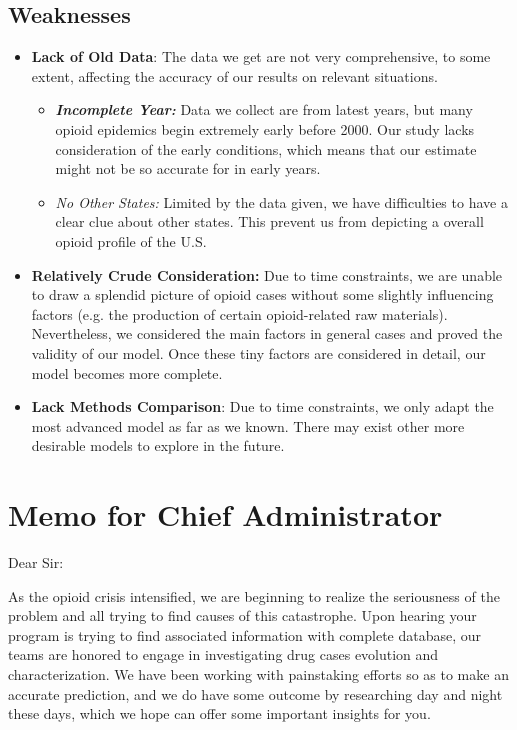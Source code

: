 \documentclass[a4paper]{article}
\begin{document}
\subsection{Weaknesses}

\begin{itemize}
  \item \textbf{Lack of Old Data}: The data we get are not very comprehensive, to some extent, affecting the accuracy of our results on relevant situations.
  \begin{itemize}
      \item \textit{\textbf{Incomplete Year:}} Data we collect are from latest years, but many opioid epidemics begin extremely early before 2000. Our study lacks consideration of the early conditions, which means that our estimate might not be so accurate for in early years.
      \item \textit{No Other States:} Limited by the data given, we have difficulties to have a clear clue about other states. This prevent us from depicting a overall opioid profile of the U.S.
  \end{itemize}
  \item \textbf{Relatively Crude Consideration:} Due to time constraints, we are unable to draw a splendid picture of opioid cases without some slightly influencing factors (e.g. the production of certain opioid-related raw materials). Nevertheless, we considered the main factors in general cases and proved the validity of our model. Once these tiny factors are considered in detail, our model becomes more complete.
  \item \textbf{Lack Methods Comparison}: Due to time constraints, we only adapt the most advanced model as far as we known. There may exist other more desirable models to explore in the future.
\end{itemize}

\clearpage
\renewcommand{\baselinestretch}{2}
\section{Memo for Chief Administrator}
\setlength{\baselineskip}{14pt}
\textsf{Dear Sir:}

\textsf{As the opioid crisis intensified, we are beginning to realize the seriousness of the problem and all trying to find causes of this catastrophe. Upon hearing your program is trying to find associated information with complete database, our teams are honored to engage in investigating drug cases evolution and characterization. We have been working with painstaking efforts so as to make an accurate prediction, and we do have some outcome by researching day and night these days, which we hope can offer some important insights for you.}
\end{document}
